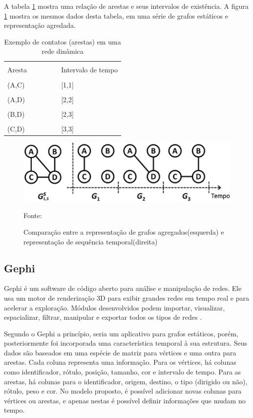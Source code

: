 A tabela \ref{tab:kim} mostra uma relação de arestas e seus intervalos de existência. A figura \ref{fig:grafoKim} mostra os mesmos
dados desta tabela, em uma série de grafos estáticos e representação agredada.

\begin{table}[htbp]
	\centering
	\begin{tabular}{l l l l l l}
	\toprule
	\\Aresta & & & & & Intervalo de tempo\\
	\midrule
	\\(A,C) & & & & & [1,1]\\
	\\(A,D) & & & & & [2,2]\\
	\\(B,D) & & & & & [2,3]\\
	\\(C,D) & & & & & [3,3]\\
	\bottomrule
	\end{tabular}
\caption{Exemplo de contatos (arestas) em uma rede dinâmica}
 \label{tab:kim}
\end{table}

\begin{figure}[htbp]
\centering
 \includegraphics[width=.55\textwidth]{chapters/fig/kim.png}
\caption{Comparação entre a representação de grafos agregados(esquerda) e representação de sequência temporal(direita)}
Fonte: \cite{kim}
\label{fig:grafoKim}
\end{figure}
\FloatBarrier

\subsection{Gephi}
Gephi é um software de código aberto para análise e manipulação de redes.
Ele usa um motor de renderização 3D para exibir grandes redes em tempo real e para acelerar a exploração.
Módulos desenvolvidos podem importar, visualizar, espacializar, filtrar, manipular e exportar todos os tipos de redes \cite{gephi}.

Segundo \cite{dynagraph} o Gephi a princípio, seria um aplicativo para grafos estáticos, porém, posteriormente
foi incorporada uma característica temporal à sua estrutura. Seus dados são baseados em
uma espécie de matriz para vértices e uma outra para arestas. Cada coluna representa uma
informação. Para os vértices, há colunas como identificador, rótulo, posição, tamanho, cor
e intervalo de tempo. Para as arestas, há colunas para o identificador, origem, destino, o
tipo (dirigido ou não), rótulo, peso e cor. No modelo proposto, é possível adicionar novas
colunas para vértices ou arestas, e apenas nestas é possível definir informações que mudam
no tempo.

